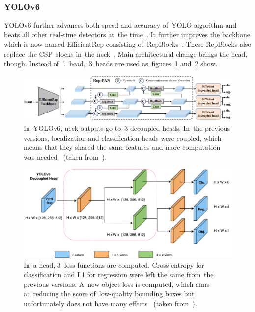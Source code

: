 \subsubsection{YOLOv6}
YOLOv6 further advances both speed and accuracy of~YOLO algorithm and beats all other real-time detectors at~the time~\cite{yolov6}. It further improves the backbone which is now named EfficientRep consisting of~RepBlocks~\cite{yolov6}. These RepBlocks also replace the CSP blocks in~the neck~\cite{yolov6}. Main architectural change brings the head, though. Instead of~1~head,~3~heads are used as~figures~\ref{yolov6-architecture} and~\ref{yolov6-head} show.

\begin{figure}[hbt]
    \includegraphics[width=1\textwidth]{img/algorithms/yolov6-architecture.png}
    \caption{In~YOLOv6, neck outputs go to~3 decoupled heads. In~the previous versions, localization and classification heads were coupled, which means that they shared the same features and more computation was needed~\cite{yolov6} (taken from~\cite{yolov6}).}
    \label{yolov6-architecture}
\end{figure}

\begin{figure}[hbt]
    \includegraphics[width=1\textwidth]{img/algorithms/yolov6-head.png}
    \caption{In~a head, 3~loss functions are computed. Cross-entropy for classification and L1 for regression were left the same from~the previous versions. A~new object loss is \hbox{computed}, which aims at~reducing the score of~low-quality bounding boxes but unfortunately does not have many effects~\cite{yolov6} (taken from~\cite{yolov6-roboflow}).}
    \label{yolov6-head}
\end{figure}

